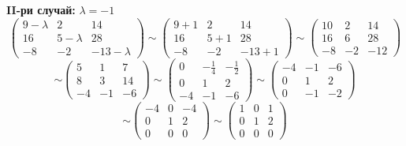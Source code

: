 \documentclass{article}
\begin{document}
\textbf{II-ри случай:} $\lambda=-1$
\[
    \left(\begin{array}{ccc}
            9-\lambda & 2         & 14          \\
            16        & 5-\lambda & 28          \\
            -8        & -2        & -13-\lambda
        \end{array}
    \right)
    \sim\left(\begin{array}{ccc}
            9+1 & 2   & 14    \\
            16  & 5+1 & 28    \\
            -8  & -2  & -13+1
        \end{array}
    \right)
    \sim\left(\begin{array}{ccc}
            10 & 2  & 14  \\
            16 & 6  & 28  \\
            -8 & -2 & -12
        \end{array}
    \right)
\]
\[
    \sim\left(\begin{array}{ccc}
            5  & 1  & 7  \\
            8  & 3  & 14 \\
            -4 & -1 & -6
        \end{array}
    \right)
    \sim\left(\begin{array}{ccc}
            0  & -\frac{1}{4} & -\frac{1}{2} \\
            0  & 1            & 2            \\
            -4 & -1           & -6
        \end{array}
    \right)
    \sim\left(\begin{array}{ccc}
            -4 & -1 & -6 \\
            0  & 1  & 2  \\
            0  & -1 & -2
        \end{array}
    \right)
\]
\[
    \sim\left(\begin{array}{ccc}
            -4 & 0 & -4 \\
            0  & 1 & 2  \\
            0  & 0 & 0
        \end{array}
    \right)
    \sim\left(\begin{array}{ccc}
            1 & 0 & 1 \\
            0 & 1 & 2 \\
            0 & 0 & 0
        \end{array}
    \right)
\]
\end{document}
